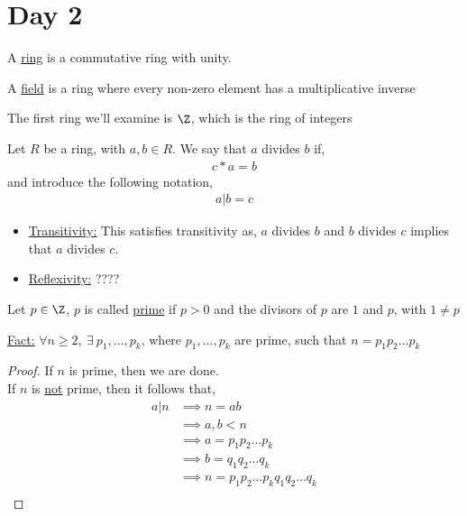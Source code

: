 \documentclass[../notes.tex]{subfiles}
\begin{document}
\section{Day 2}
\begin{definition}
    A \underline{ring} is a commutative ring with unity.
\end{definition}
\begin{definition}
    A \underline{field} is a ring where every non-zero element has a multiplicative inverse
\end{definition}
 The first ring we'll examine is $\Z$, which is the ring of integers
\begin{definition}
    Let $R$ be a ring, with $a,b\in R$. We say that $a$ divides $b$ if,
    \begin{align*}
        c*a=b
    \end{align*}
    and introduce the following notation,
    \begin{align*}
        a|b = c
    \end{align*}
    \begin{itemize}
        \item \underline{Transitivity:} This satisfies transitivity as, $a$ divides $b$
            and $b$ divides $c$ implies that $a$ divides $c$.
        \item \underline{Reflexivity:} ????
    \end{itemize}
\end{definition}
\begin{definition}
    Let $p\in \Z$, $p$ is called \underline{prime} if $p>0$ and the divisors of $p$ are $1$ and $p$, with $1\neq p$
\end{definition}
\underline{Fact:} $\forall n \geq 2,\ \exists\ p_1,\dots,p_k$, 
where $p_1,\dots,p_k$ are prime,
such that $n=p_1p_2\dots p_k$
\begin{proof}
    If $n$ is prime, then we are done.\\
    If $n$ is \underline{not} prime, then it follows that,
    \begin{align*}
        a|n &\implies  n = ab\\
        &\implies a,b < n\\
        &\implies a=p_1p_2\dots p_k\\
        &\implies b=q_1q_2\dots q_k\\
        &\implies n=p_1p_2\dots p_k q_1q_2\dots q_k\\
    \end{align*}
\end{proof}
\end{document}
